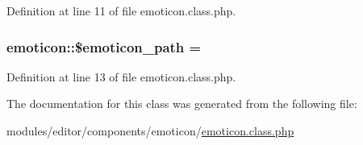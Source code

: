 Definition at line 11 of file emoticon.\+class.\+php.

\subsubsection[{\texorpdfstring{\$emoticon\+\_\+path}{$emoticon_path}}]{\setlength{\rightskip}{0pt plus 5cm}emoticon\+::\$emoticon\+\_\+path = \textquotesingle{}\textquotesingle{}}\hypertarget{classemoticon_a21bb58c0d640141cc27203b584f99dd8}{}\label{classemoticon_a21bb58c0d640141cc27203b584f99dd8}


Definition at line 13 of file emoticon.\+class.\+php.



The documentation for this class was generated from the following file\+:\begin{DoxyCompactItemize}
\item 
modules/editor/components/emoticon/\hyperlink{emoticon_8class_8php}{emoticon.\+class.\+php}\end{DoxyCompactItemize}
